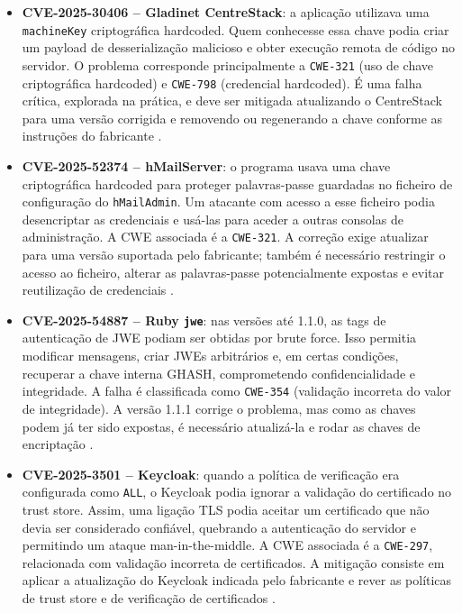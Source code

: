 \documentclass[11pt,a4paper]{article}
\begin{document}
\begin{itemize}
\item \textbf{CVE-2025-30406 -- Gladinet CentreStack}: a aplicação utilizava uma \texttt{machineKey} criptográfica hardcoded. Quem conhecesse essa chave podia criar um payload de desserialização malicioso e obter execução remota de código no servidor. O problema corresponde principalmente a \texttt{CWE-321} (uso de chave criptográfica hardcoded) e \texttt{CWE-798} (credencial hardcoded). É uma falha crítica, explorada na prática, e deve ser mitigada atualizando o CentreStack para uma versão corrigida e removendo ou regenerando a chave conforme as instruções do fabricante \cite{cve30406}.
\item \textbf{CVE-2025-52374 -- hMailServer}: o programa usava uma chave criptográfica hardcoded para proteger palavras-passe guardadas no ficheiro de configuração do \texttt{hMailAdmin}. Um atacante com acesso a esse ficheiro podia desencriptar as credenciais e usá-las para aceder a outras consolas de administração. A CWE associada é a \texttt{CWE-321}. A correção exige atualizar para uma versão suportada pelo fabricante; também é necessário restringir o acesso ao ficheiro, alterar as palavras-passe potencialmente expostas e evitar reutilização de credenciais \cite{cve52374}.
\item \textbf{CVE-2025-54887 -- Ruby \texttt{jwe}}: nas versões até 1.1.0, as tags de autenticação de JWE podiam ser obtidas por brute force. Isso permitia modificar mensagens, criar JWEs arbitrários e, em certas condições, recuperar a chave interna GHASH, comprometendo confidencialidade e integridade. A falha é classificada como \texttt{CWE-354} (validação incorreta do valor de integridade). A versão 1.1.1 corrige o problema, mas como as chaves podem já ter sido expostas, é necessário atualizá-la e rodar as chaves de encriptação \cite{cve54887}.
\item \textbf{CVE-2025-3501 -- Keycloak}: quando a política de verificação era configurada como \texttt{ALL}, o Keycloak podia ignorar a validação do certificado no trust store. Assim, uma ligação TLS podia aceitar um certificado que não devia ser considerado confiável, quebrando a autenticação do servidor e permitindo um ataque man-in-the-middle. A CWE associada é a \texttt{CWE-297}, relacionada com validação incorreta de certificados. A mitigação consiste em aplicar a atualização do Keycloak indicada pelo fabricante e rever as políticas de trust store e de verificação de certificados \cite{cve3501}.
\end{itemize}
\end{document}
